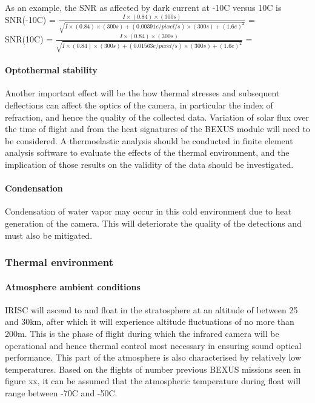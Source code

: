 As an example, the SNR as affected by dark current at -10C versus 10C is\\

 SNR(-10C) =  $\frac{I\times (0.84)\times (300s)}{\sqrt{I\times (0.84)\times (300s)+(0.00391e/pixel/s)\times (300s)+(1.6e)^2}}$ = \\
 
 SNR(10C) =  $\frac{I\times (0.84)\times (300s)}{\sqrt{I\times (0.84)\times (300s)+(0.01563e/pixel/s)\times (300s)+(1.6e)^2}}$ = \\


\paragraph{Optothermal stability}
Another important effect will be the how thermal stresses and subsequent deflections can affect the optics of the camera, in particular the index of refraction, and hence the quality of the collected data. Variation of solar flux over the time of flight and from the heat signatures of the BEXUS module will need to be considered. A thermoelastic analysis should be conducted in finite element analysis software to evaluate the effects of the thermal environment, and the implication of those results on the validity of the data should be investigated. \

\paragraph{Condensation}
Condensation of water vapor may occur in this cold environment due to heat generation of the camera. This will deteriorate the quality of the detections and must also be mitigated.  \

\subsubsection{Thermal environment}
\paragraph{Atmosphere ambient conditions}
IRISC will ascend to and float in the stratosphere at an altitude of between 25 and 30km, after which it will experience altitude fluctuations of no more than 200m. This is the phase of flight during which the infrared camera will be operational and hence thermal control most necessary in ensuring sound optical performance. This part of the atmosphere is also characterised by relatively low temperatures. Based on the flights of number previous BEXUS missions seen in figure xx, it can be assumed that the atmospheric temperature during float will range between -70C and -50C. \\

